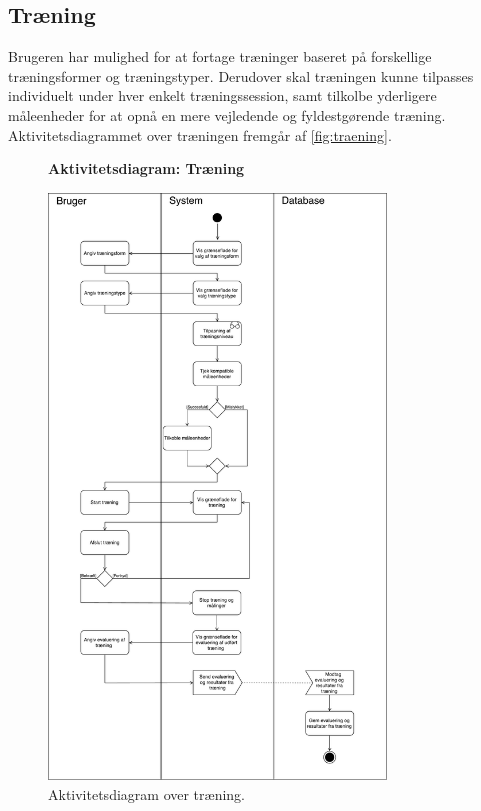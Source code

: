 \subsection*{Træning} \label{sec:traening}
Brugeren har mulighed for at fortage træninger baseret på forskellige træningsformer og træningstyper. Derudover skal træningen kunne tilpasses individuelt under hver enkelt træningssession, samt tilkolbe yderligere måleenheder for at opnå en mere vejledende og fyldestgørende træning.  
Aktivitetsdiagrammet over træningen fremgår af \autoref{fig:traening}. 

\begin{figure} [H]
\centering
\textbf{Aktivitetsdiagram: Træning}\par\medskip
\includegraphics[width=0.8\textwidth]{figures/aktivitetsdiagram/Traening}
\caption{Aktivitetsdiagram over træning.}
\label{fig:traening}
\end{figure}

